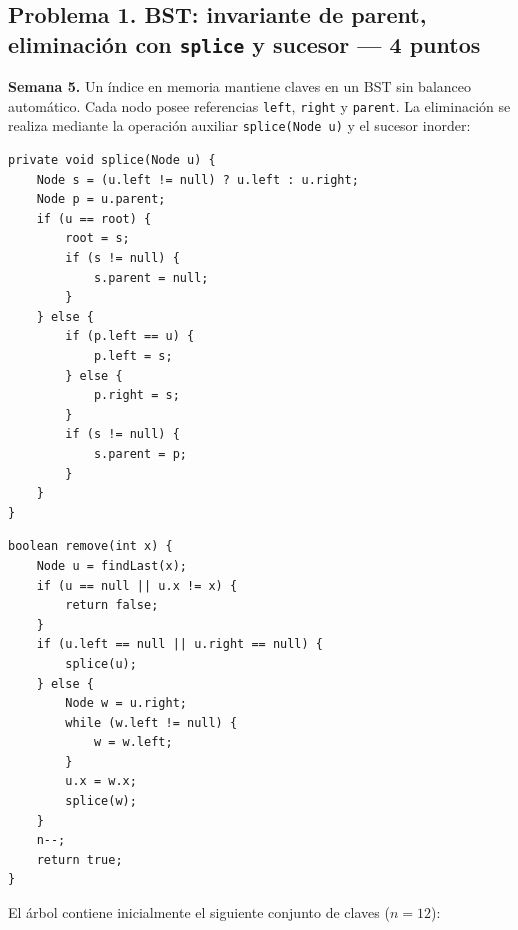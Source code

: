 \documentclass[10pt,a4paper]{article}
\begin{document}
\vspace{-2pt}
\subsection*{Problema 1. BST: invariante de parent, eliminación con \texttt{splice} y sucesor --- 4 puntos}

\footnotesize
\textbf{Semana 5.} Un índice en memoria mantiene claves en un BST sin balanceo automático. Cada nodo posee referencias \texttt{left}, \texttt{right} y \texttt{parent}. La eliminación se realiza mediante la operación auxiliar \texttt{splice(Node u)} y el sucesor inorder:

\begin{minipage}[t]{0.485\textwidth}
\begin{lstlisting}
private void splice(Node u) {
    Node s = (u.left != null) ? u.left : u.right;
    Node p = u.parent;
    if (u == root) {
        root = s;
        if (s != null) {
            s.parent = null;
        }
    } else {
        if (p.left == u) {
            p.left = s;
        } else {
            p.right = s;
        }
        if (s != null) {
            s.parent = p;
        }
    }
}
\end{lstlisting}
\end{minipage}\hfill
\begin{minipage}[t]{0.495\textwidth}
\begin{lstlisting}
boolean remove(int x) {
    Node u = findLast(x);
    if (u == null || u.x != x) {
        return false;
    }
    if (u.left == null || u.right == null) {
        splice(u);
    } else {
        Node w = u.right;
        while (w.left != null) {
            w = w.left;
        }
        u.x = w.x;
        splice(w);
    }
    n--;
    return true;
}
\end{lstlisting}
\end{minipage}

El árbol contiene inicialmente el siguiente conjunto de claves ($n = 12$):
\begin{center}
\end{center}
\end{document}
